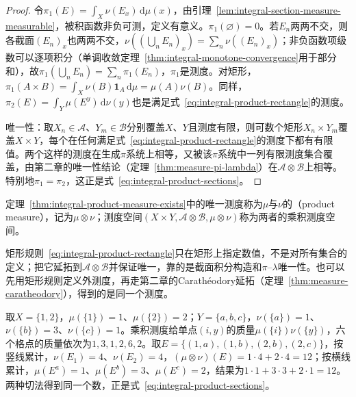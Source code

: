 \begin{proof}
令$\pi_1(E)=\int_X\nu(E_x)\,\mathrm d\mu(x)$，由引理~\ref{lem:integral-section-measure-measurable}，被积函数非负可测，定义有意义。$\pi_1(\varnothing)=0$。若$E_n$两两不交，则各截面$(E_n)_x$也两两不交，$\nu((\bigcup_nE_n)_x)=\sum_n\nu((E_n)_x)$；非负函数项级数可以逐项积分（单调收敛定理~\ref{thm:integral-monotone-convergence}用于部分和），故$\pi_1(\bigcup_nE_n)=\sum_n\pi_1(E_n)$，$\pi_1$是测度。对矩形，$\pi_1(A\times B)=\int_X\nu(B)\mathbf 1_A\,\mathrm d\mu=\mu(A)\nu(B)$。同样，$\pi_2(E)=\int_Y\mu(E^y)\,\mathrm d\nu(y)$也是满足式~\eqref{eq:integral-product-rectangle}的测度。

唯一性：取$X_n\in\mathcal A$、$Y_m\in\mathcal B$分别覆盖$X$、$Y$且测度有限，则可数个矩形$X_n\times Y_m$覆盖$X\times Y$，每个在任何满足式~\eqref{eq:integral-product-rectangle}的测度下都有有限值。两个这样的测度在生成$\pi$系统上相等，又被该$\pi$系统中一列有限测度集合覆盖，由第二章的唯一性结论（定理~\ref{thm:measure-pi-lambda}）在$\mathcal A\otimes\mathcal B$上相等。特别地$\pi_1=\pi_2$，这正是式~\eqref{eq:integral-product-sections}。
\end{proof}

\begin{definition}[乘积测度]
\label{def:integral-product-measure}
定理~\ref{thm:integral-product-measure-exists}中的唯一测度称为$\mu$与$\nu$的（product measure），记为$\mu\otimes\nu$；测度空间$(X\times Y,\mathcal A\otimes\mathcal B,\mu\otimes\nu)$称为两者的乘积测度空间。
\end{definition}

矩形规则~\eqref{eq:integral-product-rectangle}只在矩形上指定数值，不是对所有集合的定义；把它延拓到$\mathcal A\otimes\mathcal B$并保证唯一，靠的是截面积分构造和$\pi$--$\lambda$唯一性。也可以先用矩形规则定义外测度，再走第二章的Carathéodory延拓（定理~\ref{thm:measure-caratheodory}），得到的是同一个测度。

\begin{example}[有限网格上的乘积测度]
\label{ex:integral-finite-product}
取$X=\{1,2\}$，$\mu(\{1\})=1$、$\mu(\{2\})=2$；$Y=\{a,b,c\}$，$\nu(\{a\})=1$、$\nu(\{b\})=3$、$\nu(\{c\})=1$。乘积测度给单点$(i,y)$的质量$\mu(\{i\})\nu(\{y\})$，六个格点的质量依次为$1,3,1,2,6,2$。取$E=\{(1,a),(1,b),(2,b),(2,c)\}$，按竖线累计，$\nu(E_1)=4$、$\nu(E_2)=4$，$(\mu\otimes\nu)(E)=1\cdot4+2\cdot4=12$；按横线累计，$\mu(E^a)=1$、$\mu(E^b)=3$、$\mu(E^c)=2$，结果为$1\cdot1+3\cdot3+2\cdot1=12$。两种切法得到同一个数，正是式~\eqref{eq:integral-product-sections}。
\end{example}

